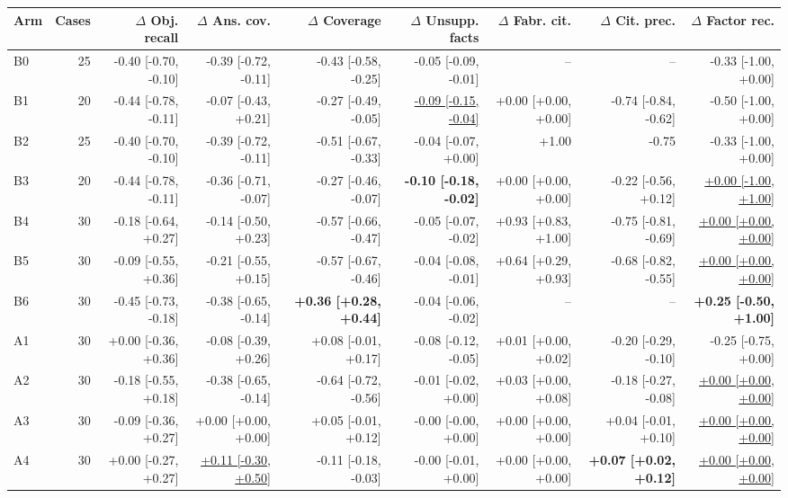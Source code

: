 \begin{table}[t]
\centering\footnotesize
\begin{adjustbox}{max width=\textwidth}
\begin{tabular}{@{}lrrrrrrrr@{}}
\toprule
Arm & Cases & $\Delta$ Obj. recall & $\Delta$ Ans. cov. & $\Delta$ Coverage & $\Delta$ Unsupp. facts & $\Delta$ Fabr. cit. & $\Delta$ Cit. prec. & $\Delta$ Factor rec. \\
\midrule
B0 & 25 & -0.40 [-0.70, -0.10] & -0.39 [-0.72, -0.11] & -0.43 [-0.58, -0.25] & -0.05 [-0.09, -0.01] & -- & -- & -0.33 [-1.00, +0.00] \\
B1 & 20 & -0.44 [-0.78, -0.11] & -0.07 [-0.43, +0.21] & -0.27 [-0.49, -0.05] & \underline{-0.09 [-0.15, -0.04]} & +0.00 [+0.00, +0.00] & -0.74 [-0.84, -0.62] & -0.50 [-1.00, +0.00] \\
B2 & 25 & -0.40 [-0.70, -0.10] & -0.39 [-0.72, -0.11] & -0.51 [-0.67, -0.33] & -0.04 [-0.07, +0.00] & +1.00 & -0.75 & -0.33 [-1.00, +0.00] \\
B3 & 20 & -0.44 [-0.78, -0.11] & -0.36 [-0.71, -0.07] & -0.27 [-0.46, -0.07] & \textbf{-0.10 [-0.18, -0.02]} & +0.00 [+0.00, +0.00] & -0.22 [-0.56, +0.12] & \underline{+0.00 [-1.00, +1.00]} \\
B4 & 30 & -0.18 [-0.64, +0.27] & -0.14 [-0.50, +0.23] & -0.57 [-0.66, -0.47] & -0.05 [-0.07, -0.02] & +0.93 [+0.83, +1.00] & -0.75 [-0.81, -0.69] & \underline{+0.00 [+0.00, +0.00]} \\
B5 & 30 & -0.09 [-0.55, +0.36] & -0.21 [-0.55, +0.15] & -0.57 [-0.67, -0.46] & -0.04 [-0.08, -0.01] & +0.64 [+0.29, +0.93] & -0.68 [-0.82, -0.55] & \underline{+0.00 [+0.00, +0.00]} \\
B6 & 30 & -0.45 [-0.73, -0.18] & -0.38 [-0.65, -0.14] & \textbf{+0.36 [+0.28, +0.44]} & -0.04 [-0.06, -0.02] & -- & -- & \textbf{+0.25 [-0.50, +1.00]} \\
A1 & 30 & +0.00 [-0.36, +0.36] & -0.08 [-0.39, +0.26] & +0.08 [-0.01, +0.17] & -0.08 [-0.12, -0.05] & +0.01 [+0.00, +0.02] & -0.20 [-0.29, -0.10] & -0.25 [-0.75, +0.00] \\
A2 & 30 & -0.18 [-0.55, +0.18] & -0.38 [-0.65, -0.14] & -0.64 [-0.72, -0.56] & -0.01 [-0.02, +0.00] & +0.03 [+0.00, +0.08] & -0.18 [-0.27, -0.08] & \underline{+0.00 [+0.00, +0.00]} \\
A3 & 30 & -0.09 [-0.36, +0.27] & +0.00 [+0.00, +0.00] & +0.05 [-0.01, +0.12] & -0.00 [-0.00, +0.00] & +0.00 [+0.00, +0.00] & +0.04 [-0.01, +0.10] & \underline{+0.00 [+0.00, +0.00]} \\
A4 & 30 & +0.00 [-0.27, +0.27] & \underline{+0.11 [-0.30, +0.50]} & -0.11 [-0.18, -0.03] & -0.00 [-0.01, +0.00] & +0.00 [+0.00, +0.00] & \textbf{+0.07 [+0.02, +0.12]} & \underline{+0.00 [+0.00, +0.00]} \\

\end{tabular}
\end{adjustbox}
\end{table}
